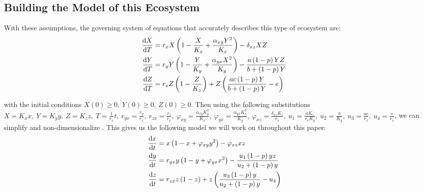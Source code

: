\subsection{Building the Model of this Ecosystem}\label{subsec:building-the-model-of-this-ecosystem}
With these assumptions, the governing system of equations that accurately describes this type of ecosystem are:
\begin{subequations}\label{model:rayla-ephraim-d}
    \begin{align}
        \diff[]{X}{T} &= r_xX\left(1-\frac{X}{K_x}+\frac{\alpha_{xy}Y^2}{K_x}\right)-\delta_{xz}XZ
        \label{eq:rayla-ephraim-d-x}\\
        \diff[]{Y}{T} &= r_yY\left(1-\frac{Y}{K_y}+\frac{\alpha_{yx}X^2}{K_y}\right)-\frac{a\left(1-p\right)YZ}{b+\left(1-p\right)Y}
        \label{eq:rayla-ephraim-d-y}\\
        \diff[]{Z}{T} &= r_zZ\left(1-\frac{Z}{K_z}\right)+Z\left(\frac{ac\left(1-p\right)Y}{b+\left(1-p\right)Y}-e\right)
        \label{eq:rayla-ephraim-d-z}
    \end{align}
\end{subequations}

with the initial conditions $X(0) \geq 0,\ Y(0) \geq 0,\ Z(0) \geq 0$. Then using the following substitutions $X=K_xx,\ Y=K_yy,\ Z=K_zz,\ T=\frac{1}{r_x}t,\ r_{yx}=\frac{r_y}{r_x},\ r_{zx}=\frac{r_z}{r_x},\ \varphi_{xy}=\frac{\alpha_{xy}K_y^2}{K_x},\ \varphi_{yx}=\frac{\alpha_{yx}K_x^2}{K_y},\ \varphi_{xz}=\frac{\delta_{xz}K_z}{r_x},\ u_1=\frac{aK_z}{r_xK_y},\ u_2=\frac{b}{K_y},\ u_3=\frac{ac}{r_x},\ u_4=\frac{e}{r_x}$, we can simplify and non-dimensionalize . This gives us the following model we will work on throughout this paper:
\begin{subequations}\label{model:rayla-ephraim}
    \begin{align}
        \diff[]{x}{t} &= x\left(1-x+\varphi_{xy}y^2\right)-\varphi_{xz}xz
        \label{eq:rayla-ephraim-x}\\
        \diff[]{y}{t} &= r_{yx}y\left(1-y+\varphi_{yx}x^2\right)-\frac{u_1\left(1-p\right)yz}{u_2+\left(1-p\right)y}
        \label{eq:rayla-ephraim-y}\\
        \diff[]{z}{t} &= r_{zx}z\left(1-z\right)+z\left(\frac{u_3\left(1-p\right)y}{u_2+\left(1-p\right)y}-u_4\right)
        \label{eq:rayla-ephraim-z}
    \end{align}
\end{subequations}

